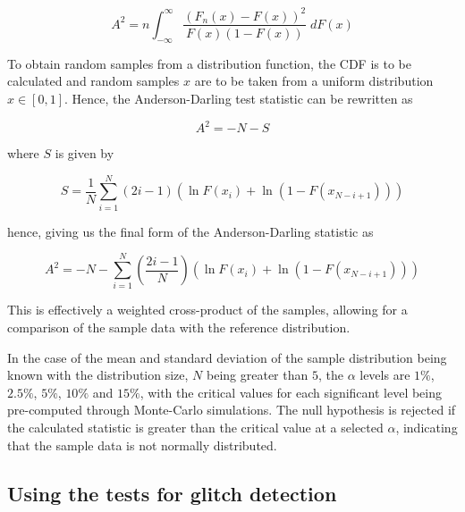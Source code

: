 \documentclass[12pt]{article}
\begin{document}
\begin{equation}
    A^2 = n \int_{-\infty}^{\infty} \frac{\left( F_n(x) - F(x) \right)^2}{F(x)(1 - F(x))} \; dF(x)
    \label{eq:ad_statistic_distance_updated}
\end{equation}

\medskip
\noindent To obtain random samples from a distribution function, the CDF is to be calculated and random samples $x$ are to be taken from a uniform distribution $x \in [0, 1]$. Hence, the Anderson-Darling test statistic can be rewritten as

\begin{equation}
    A^2 = -N -S
    \label{eq:ad_statistic}
\end{equation}

\medskip
\noindent where $S$ is given by

\begin{equation}
  S =  \frac{1}{N} \sum\limits_{i=1}^{N} \left( 2i - 1 \right) \left( \ln F(x_i) + \ln (1 - F(x_{N-i+1})) \right)
  \label{eq:ad_statistic_full}
\end{equation}

\medskip
\noindent hence, giving us the final form of the Anderson-Darling statistic as

\begin{equation}
  A^2 = -N - \sum\limits_{i=1}^{N} \left( \frac{2i - 1}{N} \right) \left( \ln F(x_i) + \ln (1 - F(x_{N-i+1})) \right)
  \label{eq:ad_statistic_full}
\end{equation}

\noindent This is effectively a weighted cross-product of the samples, allowing for a comparison of the sample data with the reference distribution.

\medskip
\noindent In the case of the mean and standard deviation of the sample distribution being known with the distribution size, $N$ being greater than $5$, the $\alpha$ levels are $1\%$, $2.5\%$, $5\%$, $10\%$ and $15\%$, with the critical values for each significant level being pre-computed through Monte-Carlo simulations. The null hypothesis is rejected if the calculated statistic is greater than the critical value at a selected $\alpha$, indicating that the sample data is not normally distributed.

\subsection{Using the tests for glitch detection}\label{UsingTests}
\end{document}
